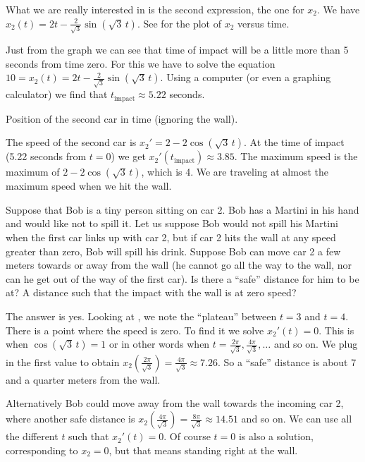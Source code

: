 \documentclass{ximera}
\begin{document}
\begin{exampleSol}
    
    What we are really interested in is the second expression, the one for $x_2$. We have $x_2(t) = 2 t - \frac{2}{\sqrt{3}} \sin ( \sqrt{3} \, t)$.  See  for the plot of $x_2$ versus time.
    
    Just from the graph we can see that time of impact will be a little more than 5 seconds from time zero.  For this we have to solve the equation $10 = x_2(t) = 2 t - \frac{2}{\sqrt{3}} \sin ( \sqrt{3} \, t)$. Using a computer (or even a graphing calculator) we find that $t_{\text{impact}} \approx 5.22$ seconds.
    
    \begin{mywrapfig}{3.25in}
        \capstart
        \caption{Position of the second car in time (ignoring the wall).\label{sosa:railcarfig}}
    \end{mywrapfig}
    
    
    The speed of the second car is $x_2' = 2 - 2 \cos ( \sqrt{3} \, t)$. At the time of impact (5.22 seconds from $t=0$) we get  $x_2'(t_{\text{impact}}) \approx 3.85$. %
    The maximum speed is the maximum of $2 - 2 \cos ( \sqrt{3} \, t )$, which is 4. We are traveling at almost the maximum speed when we hit the wall.
    
    
    Suppose that Bob is a tiny person sitting on car 2.  Bob has a Martini in his hand and would like not to spill it.  Let us suppose Bob would not spill his Martini when the first car links up with car 2, but if car 2 hits the wall at any speed greater than zero, Bob will spill his drink.  Suppose Bob can move car 2 a few meters towards or away from the wall (he cannot go all the way to the wall, nor can he get out of the way of the first car).  Is there a ``safe'' distance for him to be at?  A distance such that the impact with the wall is at zero speed?
    
    The answer is yes.  Looking at , we note the ``plateau'' between $t=3$ and $t=4$.  There is a point where the speed is zero.  To find it we solve $x_2'(t) = 0$.  This is when $\cos ( \sqrt{3} \, t) = 1$ or in other words when $t = \frac{2 \pi}{\sqrt{3}},  \frac{4 \pi}{\sqrt{3}},\ldots$ and so on.  We plug in the first value to obtain $x_2\left(\frac{2 \pi}{\sqrt{3}}\right) = \frac{4 \pi}{\sqrt{3}} \approx 7.26$.  So a ``safe'' distance is about 7 and a quarter meters from the wall.
    
    Alternatively Bob could move away from the wall towards the incoming car 2, where another safe distance is $x_2 \left( \frac{4 \pi}{\sqrt{3}} \right) = \frac{8 \pi}{\sqrt{3}} \approx 14.51$ and so on.  We can use all the different $t$ such that $x_2'(t) = 0$.  Of course $t=0$ is also a solution, corresponding to $x_2 = 0$, but that means standing right at the wall. 
\end{exampleSol}
\end{document}
